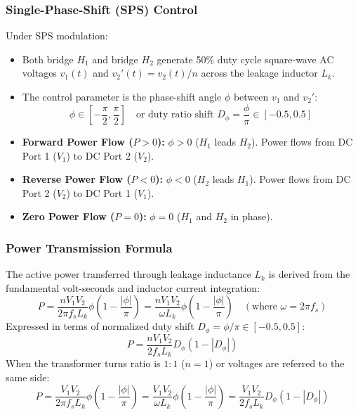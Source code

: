 \subsubsection{Single-Phase-Shift (SPS) Control}
Under SPS modulation:
\begin{itemize}
  \item Both bridge $H_1$ and bridge $H_2$ generate 50\% duty cycle square-wave AC voltages $v_1(t)$ and $v_2'(t) = v_2(t)/n$ across the leakage inductor $L_k$.
  \item The control parameter is the phase-shift angle $\phi$ between $v_1$ and $v_2'$:
  \[
  \phi \in \left[-\frac{\pi}{2}, \frac{\pi}{2}\right] \quad \text{or duty ratio shift } D_\phi = \frac{\phi}{\pi} \in [-0.5, 0.5]
  \]
  \item \textbf{Forward Power Flow ($P > 0$):} $\phi > 0$ ($H_1$ leads $H_2$). Power flows from DC Port 1 ($V_1$) to DC Port 2 ($V_2$).
  \item \textbf{Reverse Power Flow ($P < 0$):} $\phi < 0$ ($H_2$ leads $H_1$). Power flows from DC Port 2 ($V_2$) to DC Port 1 ($V_1$).
  \item \textbf{Zero Power Flow ($P = 0$):} $\phi = 0$ ($H_1$ and $H_2$ in phase).
\end{itemize}

\subsubsection{Power Transmission Formula}
The active power transferred through leakage inductance $L_k$ is derived from the fundamental volt-seconds and inductor current integration:
\begin{equation}
P = \frac{n V_1 V_2}{2\pi f_s L_k} \phi \left(1 - \frac{|\phi|}{\pi}\right) = \frac{n V_1 V_2}{\omega L_k} \phi \left(1 - \frac{|\phi|}{\pi}\right) \quad \left(\text{where } \omega = 2\pi f_s\right)
\end{equation}
Expressed in terms of normalized duty shift $D_\phi = \phi / \pi \in [-0.5, 0.5]$:
\begin{equation}
P = \frac{n V_1 V_2}{2 f_s L_k} D_\phi (1 - |D_\phi|)
\end{equation}
When the transformer turns ratio is $1:1$ ($n=1$) or voltages are referred to the same side:
\begin{equation}
P = \frac{V_1 V_2}{2\pi f_s L_k} \phi \left(1 - \frac{|\phi|}{\pi}\right) = \frac{V_1 V_2}{\omega L_k} \phi \left(1 - \frac{|\phi|}{\pi}\right) = \frac{V_1 V_2}{2 f_s L_k} D_\phi (1 - |D_\phi|)
\end{equation}

